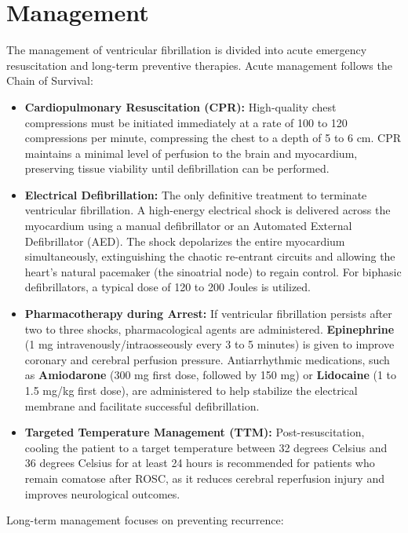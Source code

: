 \section*{Management}
The management of ventricular fibrillation is divided into acute emergency resuscitation and long-term preventive therapies.
Acute management follows the Chain of Survival:
\begin{itemize}
    \item \textbf{Cardiopulmonary Resuscitation (CPR):} High-quality chest compressions must be initiated immediately at a rate of 100 to 120 compressions per minute, compressing the chest to a depth of 5 to 6 cm. CPR maintains a minimal level of perfusion to the brain and myocardium, preserving tissue viability until defibrillation can be performed.
    \item \textbf{Electrical Defibrillation:} The only definitive treatment to terminate ventricular fibrillation. A high-energy electrical shock is delivered across the myocardium using a manual defibrillator or an Automated External Defibrillator (AED). The shock depolarizes the entire myocardium simultaneously, extinguishing the chaotic re-entrant circuits and allowing the heart's natural pacemaker (the sinoatrial node) to regain control. For biphasic defibrillators, a typical dose of 120 to 200 Joules is utilized.
    \item \textbf{Pharmacotherapy during Arrest:} If ventricular fibrillation persists after two to three shocks, pharmacological agents are administered. \textbf{Epinephrine} (1 mg intravenously/intraosseously every 3 to 5 minutes) is given to improve coronary and cerebral perfusion pressure. Antiarrhythmic medications, such as \textbf{Amiodarone} (300 mg first dose, followed by 150 mg) or \textbf{Lidocaine} (1 to 1.5 mg/kg first dose), are administered to help stabilize the electrical membrane and facilitate successful defibrillation.
    \item \textbf{Targeted Temperature Management (TTM):} Post-resuscitation, cooling the patient to a target temperature between 32 degrees Celsius and 36 degrees Celsius for at least 24 hours is recommended for patients who remain comatose after ROSC, as it reduces cerebral reperfusion injury and improves neurological outcomes.
\end{itemize}
Long-term management focuses on preventing recurrence:

